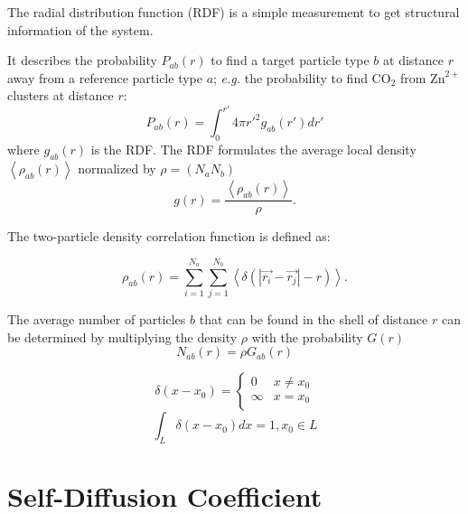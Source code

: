 \documentclass[
  letterpaper,
  DIV=11,
  numbers=noendperiod]{scrreprt}
\begin{document}

The radial distribution function (RDF) is a simple measurement to get
structural information of the system.

It describes the probability \(P_{ab}(r)\) to find a target particle
type \(b\) at distance \(r\) away from a reference particle type \(a\);
\emph{e.g.} the probability to find \(\mathrm{C}\mathrm{O}_2\) from
\(\mathrm{Zn}^{2+}\) clusters at distance \(r\): \[
P_{ab}(r) = \int_{0}^{r'} 4\pi r'^2 g_{ab}(r') dr'
\] where \(g_{ab}(r)\) is the RDF. The RDF formulates the average local
density \(\left <\rho_{ab}(r)\right >\) normalized by \(\rho=(N_a N_b)\)
\[
g(r) = \frac{\left <\rho_{ab}(r)\right >}{\rho}.
\]

The two-particle density correlation function is defined as:

\[
\rho_{ab}(r) =\sum_{i=1}^{N_a} \sum_{j=1}^{N_b} \left < \delta(|\vec{r_{i}}-\vec{r_{j}}| -r)\right >.
\]

The average number of particles \(b\) that can be found in the shell of
distance \(r\) can be determined by multiplying the density \(\rho\)
with the probability \(G(r)\) \[ 
N_{ab}(r) = \rho G_{ab}(r)
\]

\begin{tcolorbox}[enhanced jigsaw, title=\textcolor{quarto-callout-tip-color}{\faLightbulb}\hspace{0.5em}{Dirac-Delta Function}, colbacktitle=quarto-callout-tip-color!10!white, bottomtitle=1mm, breakable, colframe=quarto-callout-tip-color-frame, toprule=.15mm, opacitybacktitle=0.6, bottomrule=.15mm, titlerule=0mm, arc=.35mm, rightrule=.15mm, toptitle=1mm, coltitle=black, left=2mm, opacityback=0, colback=white, leftrule=.75mm]

\[
\delta(x-x_0) =  \begin{cases}
      0        & x \neq x_0\\
      \infty & x = x_0\\
    \end{cases}   
\] \[
\int_L \delta(x-x_0) dx = 1, x_0 \in L
\]

\end{tcolorbox}

\hypertarget{self-diffusion-coefficient}{%
\chapter*{Self-Diffusion Coefficient}\label{self-diffusion-coefficient}}
\end{document}
